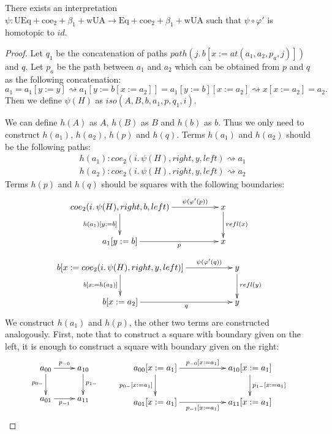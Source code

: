 \documentclass{mscs}
\newcommand{\repl}{:=}
\newcommand{\idtype}{\rightsquigarrow}
\newcommand{\wUA}{\mathrm{wUA}}
\newcommand{\coe}{\mathrm{coe}}
\newcommand{\Eq}{\mathrm{Eq}}
\newcommand{\UEq}{\mathrm{UEq}}
\numberwithin{figure}{section}
\begin{document}
\begin{lem}[UA]
There exists an interpretation $\psi : \UEq + \coe_2 + \beta_1 + \wUA \to \Eq + \coe_2 + \beta_1 + \wUA$ such that $\psi \circ \varphi'$ is homotopic to $id$.
\end{lem}
\begin{proof}
Let $q_1$ be the concatenation of paths $path(j.\,b[x \repl at(a_1, a_2, p_a,j)])$ and $q$.
Let $p_a$ be the path between $a_1$ and $a_2$ which can be obtained from $p$ and $q$ as the following concatenation:
\[ a_1 = a_1[y \repl y] \idtype a_1[y \repl b[x \repl a_2]] = a_1[y \repl b][x \repl a_2] \idtype x[x \repl a_2] = a_2. \]
Then we define $\psi(H)$ as $iso(A, B, b, a_1, p, q_1, i)$.

We can define $h(A)$ as $A$, $h(B)$ as $B$ and $h(b)$ as $b$.
Thus we only need to construct $h(a_1)$, $h(a_2)$, $h(p)$ and $h(q)$.
Terms $h(a_1)$ and $h(a_2)$ should be the following paths:
\begin{align*}
& h(a_1) : coe_2(i.\,\psi(H), right, y, left) \idtype a_1 \\
& h(a_2) : coe_2(i.\,\psi(H), right, y, left) \idtype a_2
\end{align*}
Terms $h(p)$ and $h(q)$ should be squares with the following boundaries:
\[ \xymatrix{ coe_2(i.\,\psi(H), right, b, left) \ar[rr]^-{\psi(\varphi'(p))} \ar[d]_{h(a_1)[y \repl b]} & & x \ar[d]^{refl(x)} \\
              a_1[y \repl b] \ar[rr]_-p                                                                          & & x
            } \]
\[ \xymatrix{ b[x \repl coe_2(i.\,\psi(H), right, y, left)] \ar[rr]^-{\psi(\varphi'(q))} \ar[d]_{b[x \repl h(a_2)]} & & y \ar[d]^{refl(y)} \\
              b[x \repl a_2] \ar[rr]_-q                                                                                     & & y
            } \]
We construct $h(a_1)$ and $h(p)$, the other two terms are constructed analogously.
First, note that to construct a square with boundary given on the left, it is enough to construct a square with boundary given on the right:
\[ \xymatrix{ a_{00} \ar[r]^{p_{-0}} \ar[d]_{p_{0-}} & a_{10} \ar[d]^{p_{1-}} \\
              a_{01} \ar[r]_{p_{-1}}                 & a_{11}
            }
\qquad
   \xymatrix{ a_{00}[x \repl a_1] \ar[rr]^{p_{-0}[x \repl a_1]} \ar[d]_{p_{0-}[x \repl a_1]} & & a_{10}[x \repl a_1] \ar[d]^{p_{1-}[x \repl a_1]} \\
              a_{01}[x \repl a_1] \ar[rr]_{p_{-1}[x \repl a_1]}                              & & a_{11}[x \repl a_1]
}\]
\end{proof}
\end{document}
